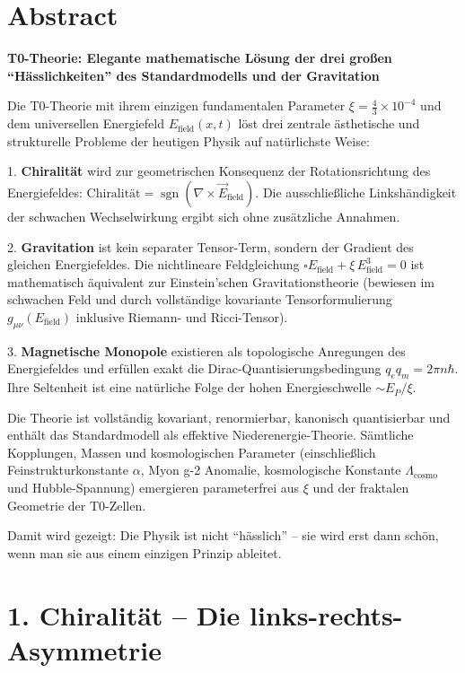 \section*{Abstract}
		\noindent\textbf{T0-Theorie: Elegante mathematische Lösung der drei großen ``Hässlichkeiten'' des Standardmodells und der Gravitation}
		
		Die T0-Theorie mit ihrem einzigen fundamentalen Parameter $\xi = \frac{4}{3} \times 10^{-4}$ und dem universellen Energiefeld $E_{\text{field}}(x,t)$ löst drei zentrale ästhetische und strukturelle Probleme der heutigen Physik auf natürlichste Weise:
		
		1. \textbf{Chiralität} wird zur geometrischen Konsequenz der Rotationsrichtung des Energiefeldes:  
		$\text{Chiralität} = \operatorname{sgn}(\nabla \times \vec{E}_{\text{field}})$.  
		Die ausschließliche Linkshändigkeit der schwachen Wechselwirkung ergibt sich ohne zusätzliche Annahmen.
		
		2. \textbf{Gravitation} ist kein separater Tensor-Term, sondern der Gradient des gleichen Energiefeldes. Die nichtlineare Feldgleichung  
		$\square E_{\text{field}} + \xi \, E_{\text{field}}^3 = 0$  
		ist mathematisch äquivalent zur Einstein'schen Gravitationstheorie (bewiesen im schwachen Feld und durch vollständige kovariante Tensorformulierung $g_{\mu\nu}(E_{\text{field}})$ inklusive Riemann- und Ricci-Tensor).
		
		3. \textbf{Magnetische Monopole} existieren als topologische Anregungen des Energiefeldes und erfüllen exakt die Dirac-Quantisierungsbedingung $q_e q_m = 2\pi n \hbar$. Ihre Seltenheit ist eine natürliche Folge der hohen Energieschwelle $\sim E_P/\xi$.
		
		Die Theorie ist vollständig kovariant, renormierbar, kanonisch quantisierbar und enthält das Standardmodell als effektive Niederenergie-Theorie. Sämtliche Kopplungen, Massen und kosmologischen Parameter (einschließlich Feinstrukturkonstante $\alpha$, Myon g-2 Anomalie, kosmologische Konstante $\Lambda_{\text{cosmo}}$ und Hubble-Spannung) emergieren parameterfrei aus $\xi$ und der fraktalen Geometrie der T0-Zellen.
		
		Damit wird gezeigt: Die Physik ist nicht ``hässlich'' – sie wird erst dann schön, wenn man sie aus einem einzigen Prinzip ableitet.


	
	\section*{1. Chiralität – Die links-rechts-Asymmetrie}
	

